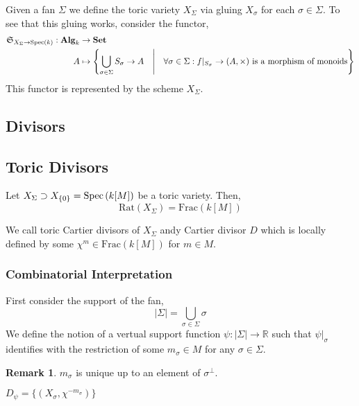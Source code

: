 \documentclass[12pt]{extarticle}
\newcommand{\R}{\mathbb{R}}
\newcommand{\Set}{\mathbf{Set}}
\theoremstyle{definition}
\newtheorem{remark}{Remark}
\newenvironment{definition}[1][Definition:]{\begin{trivlist}
\item[\hskip \labelsep {\bfseries #1}]}{\end{trivlist}}
\begin{document}
\begin{definition}
Given a fan $\Sigma$ we define the toric variety $X_\Sigma$ via gluing $X_\sigma$ for each $\sigma \in \Sigma$. To see that this gluing works, consider the functor,
\begin{align*}
\Sf_{X_\Sigma \to \Spec{k}} : \Alg_k & \to \Set
\\
A & \mapsto \left\{ \bigcup_{\sigma \in \Sigma} S_\sigma \to A \quad \middle| \quad \forall \sigma \in \Sigma : f|_{S_\sigma} \to (A, \times) \text{ is a morphism of monoids} \right\} 
\end{align*}
This functor is represented by the scheme $X_\Sigma$. 
\end{definition}

\subsection{Divisors}

\subsection{Toric Divisors}

\newcommand{\Rat}[1]{\mathrm{Rat} \left( #1 \right)}
\newcommand{\Frac}[1]{\mathrm{Frac} \left( #1 \right)}

Let $X_\Sigma \supset X_{\{ 0 \}} = \mathrm{Spec}\left( k[M] \right)$ be a toric variety. Then,
\[ \Rat{X_\Sigma} = \Frac{k[M]} \]

\begin{definition}
We call toric Cartier divisors of $X_\Sigma$ andy Cartier divisor $D$ which is locally defined by some $\chi^m \in \Frac{k[M]}$ for $m \in M$. 
\end{definition}

\subsubsection{Combinatorial Interpretation}

First consider the support of the fan,
\[ | \Sigma | = \bigcup_{\sigma \in \Sigma} \sigma \]
We define the notion of a vertual support function $\psi : | \Sigma | \to \R$ such that $\psi |_\sigma$ identifies with the restriction of some $m_\sigma \in M$ for any $\sigma \in \Sigma$. 

\begin{remark}
$m_\sigma$ is unique up to an element of $\sigma^\perp$.
\end{remark}

\begin{definition}
$D_\psi = \{ (X_\sigma, \chi^{-m_\sigma}) \}$
\end{definition}
\end{document}
